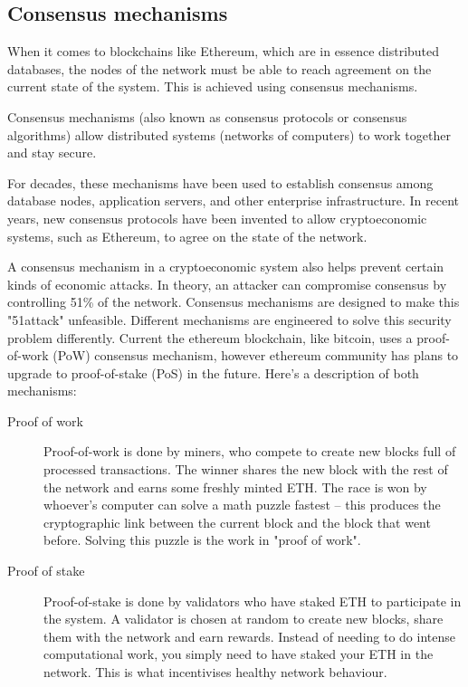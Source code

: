 \subsection{Consensus mechanisms}
When it comes to blockchains like Ethereum, which are in essence distributed databases, the nodes of the network must be able to reach agreement on the current state of the system. This is achieved using consensus mechanisms.

Consensus mechanisms (also known as consensus protocols or consensus algorithms) allow distributed systems (networks of computers) to work together and stay secure.

For decades, these mechanisms have been used to establish consensus among database nodes, application servers, and other enterprise infrastructure. In recent years, new consensus protocols have been invented to allow \gls{cryptoeconomic} systems, such as Ethereum, to agree on the state of the network.

A consensus mechanism in a cryptoeconomic system also helps prevent certain kinds of economic attacks. In theory, an attacker can compromise consensus by controlling 51\% of the network. Consensus mechanisms are designed to make this "\gls{51attack}" unfeasible. Different mechanisms are engineered to solve this security problem differently. Current the ethereum blockchain, like bitcoin, uses a proof-of-work (PoW) consensus mechanism, however ethereum community has plans to upgrade to proof-of-stake (PoS) in the future\cite{ethereumcommunityEthereumDevelopmentDocumentation}. Here's a description of both mechanisms:

\begin{description}
\item[Proof of work] Proof-of-work is done by miners, who compete to create new blocks full of processed transactions. The winner shares the new block with the rest of the network and earns some freshly minted \gls{ETH}. The race is won by whoever's computer can solve a math puzzle fastest – this produces the cryptographic link between the current block and the block that went before. Solving this puzzle is the work in "proof of work".
\item[Proof of stake] Proof-of-stake is done by validators who have staked ETH to participate in the system. A validator is chosen at random to create new blocks, share them with the network and earn rewards. Instead of needing to do intense computational work, you simply need to have staked your ETH in the network. This is what incentivises healthy network behaviour.
\end{description}

